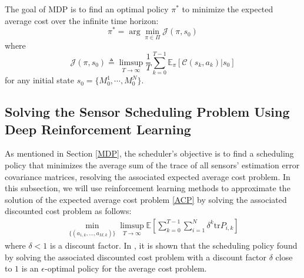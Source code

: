 \documentclass[twocolumn]{IEEEtran}
\begin{document}
The goal of MDP is to find an optimal policy $\pi^*$ to minimize the expected average cost over the infinite time horizon:
\begin{equation*}
    \pi^*=\arg\min_{\pi\in\Pi}\mathcal{J}(\pi,s_0)
\end{equation*}
where
\begin{equation*}
    \mathcal{J}(\pi,s_0)\triangleq\limsup_{T\to\infty}\frac1T\sum_{k=0}^{T-1}\mathbb{E}_\pi[\mathcal{C}(s_k,a_k)|s_0]
\end{equation*}
for any initial state $s_{0}=\{M_{0}^{1},\cdots, M_{0}^{N}\}$. 
\medskip

\subsection{Solving the Sensor Scheduling Problem Using Deep Reinforcement Learning}
As mentioned in Section \ref{MDP}, the scheduler's objective is to find a scheduling policy that minimizes the average sum of the trace of all sensors' estimation error covariance matrices, resolving the associated expected average cost problem. In this subsection, we will use reinforcement learning methods to approximate the solution of the expected average cost problem \eqref{ACP} by solving the associated discounted cost problem as follows:
\begin{equation} \label{DCP1}
\begin{split}
\min_{{\{(a_{1,k},...,a_{M,k})\}}}\limsup_{T\to\infty}\mathbb{E}\left[\sum_{k=0}^{T-1}\sum_{i=1}^{N}\delta^{k}\mathrm{tr}P_{i,k}\right]
\end{split}
\end{equation}
where $\delta<1$ is a discount factor. In \cite{hernandez2012discrete}, it is shown that the scheduling policy found by solving the associated discounted cost problem with a discount factor $\delta$ close to $1$ is an $\epsilon$-optimal policy for the average cost problem. 
\end{document}
